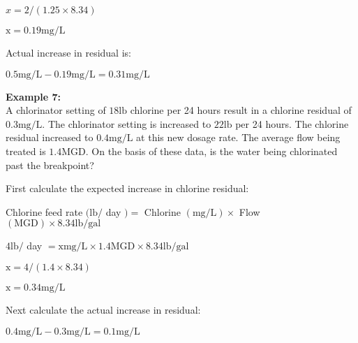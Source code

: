 \documentclass{article}
\begin{document}
$x=2 /(1.25 \times 8.34)$

$\mathrm{x}=0.19 \mathrm{mg} / \mathrm{L}$

Actual increase in residual is:

$0.5 \mathrm{mg} / \mathrm{L}-0.19 \mathrm{mg} / \mathrm{L}=0.31 \mathrm{mg} / \mathrm{L}$

\textbf{Example 7:}\\
A chlorinator setting of $18 \mathrm{lb}$ chlorine per 24 hours result in a chlorine residual of $0.3 \mathrm{mg} / \mathrm{L}$. The chlorinator setting is increased to $22 \mathrm{lb}$ per 24 hours. The chlorine residual increased to $0.4 \mathrm{mg} / \mathrm{L}$ at this new dosage rate. The average flow being treated is $1.4 \mathrm{MGD}$. On the basis of these data, is the water being chlorinated past the breakpoint?

First calculate the expected increase in chlorine residual:

Chlorine feed rate $(\mathrm{lb} /$ day $)=$ Chlorine $(\mathrm{mg} / \mathrm{L}) \times$ Flow $(\mathrm{MGD}) \times 8.34 \mathrm{lb} / \mathrm{gal}$

$4 \mathrm{lb} /$ day $=\mathrm{x} \mathrm{mg} / \mathrm{L} \times 1.4 \mathrm{MGD} \times 8.34 \mathrm{lb} / \mathrm{gal}$

$\mathrm{x}=4 /(1.4 \times 8.34)$

$\mathrm{x}=0.34 \mathrm{mg} / \mathrm{L}$

Next calculate the actual increase in residual:

$0.4 \mathrm{mg} / \mathrm{L}-0.3 \mathrm{mg} / \mathrm{L}=0.1 \mathrm{mg} / \mathrm{L}$
\end{document}
